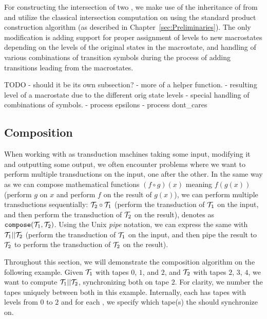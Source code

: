 For constructing the intersection of two \nfts, we make use of the inheritance of \nfts from \nfas and utilize the classical intersection computation on \nfa using the standard product construction algorithm (as described in Chapter~\ref{sec:Preliminaries}).
The only modification is adding support for proper assignment of levels to new macrostates depending on the levels of the original \nft states in the macrostate, and handling of various combinations of transition symbols during the process of adding transitions leading from the macrostates.

TODO
- should it be its own subsection?
- more of a helper function.
- resulting level of a macrostate due to the different orig state levels
- special handling of combinations of symbols.
  - process epsilons
  - process dont\_cares

\subsection{Composition}

When working with \nfts as transduction machines taking some input, modifying it and outputting some output, we often encounter problems where we want to perform multiple transductions on the input, one after the other.
In the same way as we can compose mathematical functions $(f \circ g)(x)$ meaning $f(g(x))$ (perform $g$ on $x$ and perform $f$ on the result of $g(x)$),
we can perform multiple \nfts transductions sequentially: $\mathcal{T}_2 \circ \mathcal{T}_1$
(perform the transduction of $\mathcal{T}_1$ on the input, and then perform the transduction of $\mathcal{T}_2$ on the result), denotes as $\texttt{compose}(\mathcal{T}_1, \mathcal{T}_2)$.
Using the Unix \emph{pipe} notation, we can express the same with $\mathcal{T}_1 || \mathcal{T}_2$
(perform the transduction of $\mathcal{T}_1$ on the input, and then pipe the result to $\mathcal{T}_2$ to perform the transduction of $\mathcal{T}_2$ on the result).

\begin{example}
  Throughout this section, we will demonstrate the composition algorithm on the following example.
  Given \nft $\mathcal{T}_1$ with tapes $0$, $1$, and $2$, and $\mathcal{T}_2$ with tapes $2$, $3$, $4$, we want to compute $\mathcal{T}_1 || \mathcal{T}_2$, synchronizing both \nfts on tape $2$.
  For clarity, we number the tapes uniquely between both \nfts in this example. Internally, each \nft has tapes with levels from $0$ to $2$ and for each \nft, we specify which tape(s) the \nfts should synchronize on.
\end{example}

